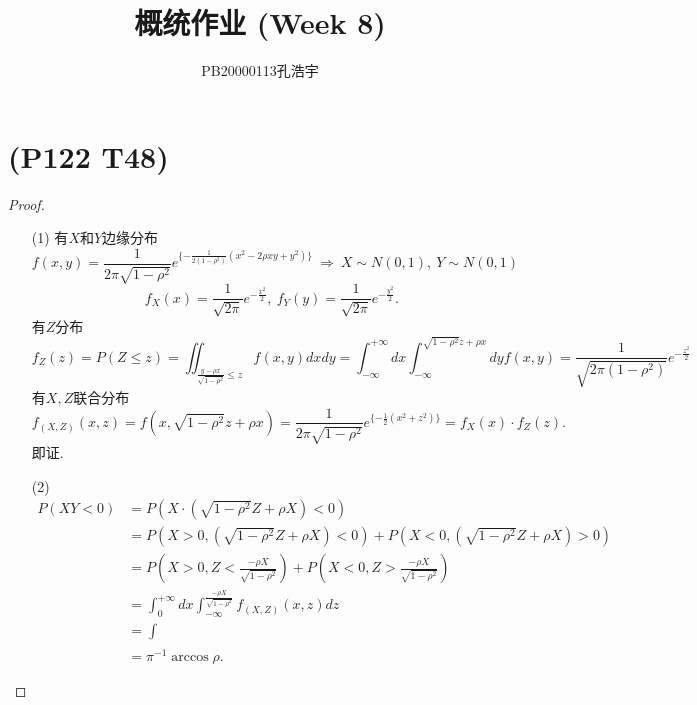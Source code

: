 \documentclass{article}
\title{概统作业 (Week 8)}
\author{PB20000113孔浩宇}
\begin{document}
\maketitle
\section{(P122 T48)}  %
\begin{proof}
    \begin{enumerate}
        \item []
        \item [(1)]
        有$X$和$Y$边缘分布
        \[
            f(x,y) = 
            \frac{1}{2\pi \sqrt{1-\rho^2}} 
            e^{\{-\frac{1}{2(1-\rho^2)} (x^2 - 2\rho xy + y^2) \}}  
            \ \Rightarrow\ 
            X\sim N(0,1),\ Y\sim N(0,1)
        \]
        \[
            f_{X} (x) = \frac{1}{\sqrt{2\pi}} e^{-\frac{x^2}{2}},\ 
            f_{Y} (y) = \frac{1}{\sqrt{2\pi}} e^{-\frac{y^2}{2}}.
        \]
        有$Z$分布
        \[
            f_{Z} (z) = P(Z \leq z) 
            = \iint_{\frac{y-\rho x}{\sqrt{1-\rho^2}} \leq z} f(x,y) dx dy
            = \int_{-\infty}^{+\infty} dx \int_{-\infty}^{\sqrt{1-\rho^2}z + \rho x}dy f(x,y)
            = \frac{1}{\sqrt{2\pi (1-\rho^2)}} 
            e^{-\frac{z^2}{2}}  
        \]
        有$X,Z$联合分布
        \[
            f_{(X,Z)} (x,z) 
            = f(x, \sqrt{1-\rho^2}z + \rho x) 
            = \frac{1}{2\pi \sqrt{1-\rho^2}} 
            e^{\{-\frac{1}{2} (x^2 + z^2) \}}  
            = f_{X}(x) \cdot f_{Z}(z) .
        \]
        即证.
        \item [(2)]
        \begin{align*}
            P(XY<0) 
            & = P(X\cdot (\sqrt{1-\rho^2} Z + \rho X) < 0)\\  
            & = P(X>0 , (\sqrt{1-\rho^2} Z + \rho X) < 0) + P(X<0 , (\sqrt{1-\rho^2} Z + \rho X) > 0)\\
            & = P(X>0 , Z < \frac{-\rho X}{\sqrt{1-\rho^2}}) + P(X<0 , Z > \frac{-\rho X}{\sqrt{1-\rho^2}}) \\
            & = \int_{0}^{+\infty} dx \int_{-\infty}^{\frac{-\rho X}{\sqrt{1-\rho^2}}}  f_{(X,Z)}(x,z) dz \\
            & = \int_{}\\
            & = \pi ^{-1} \arccos \rho .
        \end{align*}
    \end{enumerate}
\end{proof}
\end{document}
